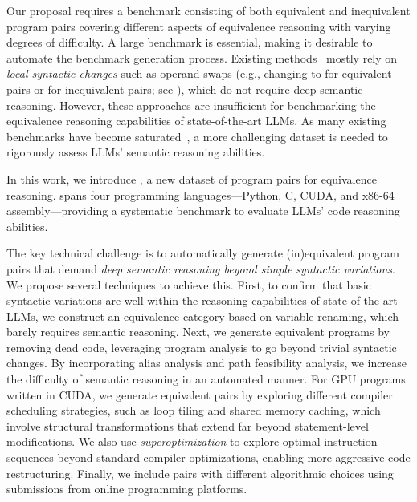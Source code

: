 Our proposal requires a benchmark consisting of both equivalent and inequivalent program pairs covering different aspects of equivalence reasoning with varying degrees of difficulty. A large benchmark is essential, making it desirable to automate the benchmark generation process. Existing methods~\cite{badihi2021eqbench,maveli2024can} mostly rely on \emph{local syntactic changes} such as operand swaps (e.g., changing  to  for equivalent pairs or  for inequivalent pairs; see ), which do not require deep semantic reasoning. However, these approaches are insufficient for benchmarking the equivalence reasoning capabilities of state-of-the-art LLMs. As many existing benchmarks have become saturated~\cite{phan2025humanity}, a more challenging dataset is needed to rigorously assess LLMs' semantic reasoning abilities.

In this work, we introduce \textbf{\name{}}, a new dataset of \numpair program pairs for equivalence reasoning. \name{} spans four programming languages—Python, C, CUDA, and x86-64 assembly—providing a systematic benchmark to evaluate LLMs' code reasoning abilities.

The key technical challenge is to automatically generate (in)equivalent program pairs that demand \emph{deep semantic reasoning beyond simple syntactic variations}. We propose several techniques to achieve this. First, to confirm that basic syntactic variations are well within the reasoning capabilities of state-of-the-art LLMs, we construct an equivalence category based on variable renaming, which barely requires semantic reasoning. Next, we generate equivalent programs by removing dead code, leveraging program analysis to go beyond trivial syntactic changes. By incorporating alias analysis and path feasibility analysis, we increase the difficulty of semantic reasoning in an automated manner. For GPU programs written in CUDA, we generate equivalent pairs by exploring different compiler scheduling strategies, such as loop tiling and shared memory caching, which involve structural transformations that extend far beyond statement-level modifications. We also use \emph{superoptimization} to explore optimal instruction sequences beyond standard compiler optimizations, enabling more aggressive code restructuring. Finally, we include pairs with different algorithmic choices using submissions from online programming platforms.

